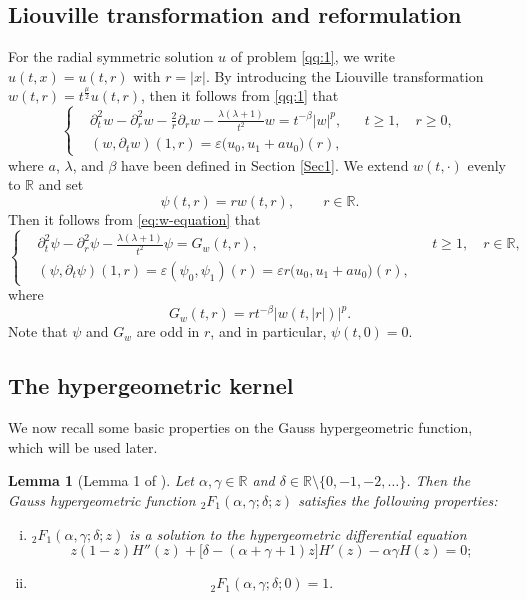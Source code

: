 \documentclass[11pt,twoside]{article}
\newcommand{\R}{\mathbb R}
\newcommand{\p}{\partial}
\newcommand{\ve}{\varepsilon}
\newcommand{\f}{\frac}
\theoremstyle{plain}
\newtheorem{lemma}[theorem]{Lemma}
\theoremstyle{definition}
\theoremstyle{remark}
\numberwithin{equation}{section}
\begin{document}
\subsection{Liouville transformation and reformulation}
\label{liou}
For the radial symmetric solution $u$ of problem \eqref{qq:1}, we write $u(t,x)=u(t,r)$ with $r=|x|$.
By introducing the Liouville transformation
$w(t,r)=t^{\f{\mu}{2}}u(t,r)$,
then it follows from \eqref{qq:1} that
\begin{equation}
\label{eq:w-equation}
\left\{
\begin{aligned}
&\p_t^2w-\p_r^2w-\f{2}{r}\p_r w
-\f{\lambda(\lambda+1)}{t^2}w
=t^{-\beta}|w|^p,
&&t\geq1,\quad r\geq0,\\
&(w,\p_tw)(1,r)
=\ve\bigl(u_0,u_1+a u_0\bigr)(r),
\end{aligned}
\right.
\end{equation}
where $a$, $\lambda$, and $\beta$ have been defined in Section \ref{Sec1}. We extend $w(t,\cdot)$ evenly to $\R$ and set
\begin{equation}
\label{eq:psi}
\psi(t,r)=rw(t,r),\qquad r\in\R.
\end{equation}
Then it follows from \eqref{eq:w-equation} that
\begin{equation}
\label{eq:psi-equation}
\left\{
\begin{aligned}
&\p_t^2\psi-\p_r^2\psi
-\f{\lambda(\lambda+1)}{t^2}\psi
=G_w(t,r),
&&t\geq1,\quad r\in\R,\\
&(\psi,\p_t\psi)(1,r)
=\ve(\psi_0,\psi_1)(r)
=\ve r\bigl(u_0,u_1+a u_0\bigr)(r),
\end{aligned}
\right.
\end{equation}
where
\begin{equation}
\label{eq:Gw}
G_w(t,r)=rt^{-\beta}|w(t,|r|)|^p.
\end{equation}
Note that $\psi$ and $G_w$ are odd in $r$, and in particular,
$\psi(t,0)=0$.

\subsection{The hypergeometric kernel}

We now recall some basic properties on
the Gauss hypergeometric function, which will be used later.

\begin{lemma}[Lemma 1 of \cite{P2}]
\label{lem:hypergeometric}
Let $\alpha,\gamma\in\R$ and
$\delta\in\R\setminus\{0,-1,-2,\ldots\}$. Then the Gauss
hypergeometric function ${}_2F_1(\alpha,\gamma;\delta;z)$ satisfies
the following properties:
\begin{enumerate}[(i)]
\item ${}_2F_1(\alpha,\gamma;\delta;z)$ is a solution to the  hypergeometric
differential equation
\begin{equation} \label{eq:hyp-ode} z(1-z)H''(z) +\bigl[\delta-(\alpha+\gamma+1)z\bigr]H'(z) -\alpha\gamma H(z)=0; \end{equation}


\item
\[
{}_2F_1(\alpha,\gamma;\delta;0)=1.
\]
\end{enumerate}
\end{lemma}
\end{document}
